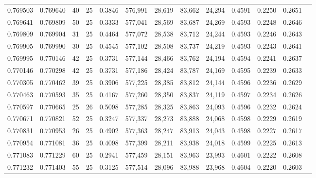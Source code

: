 \begin{tabular}{rrrrrrrrrrrrr}
0.769503 & 0.769640 &    40 &  25 &                                     0.3846 & 576,991 &  28,619 &  83,662 &  24,294 & 0.4591 & 0.2250 & 0.2651 \\
0.769641 & 0.769809 &    50 &  25 &                                     0.3333 & 577,041 &  28,569 &  83,687 &  24,269 & 0.4593 & 0.2248 & 0.2646 \\
0.769809 & 0.769904 &    31 &  25 &                                     0.4464 & 577,072 &  28,538 &  83,712 &  24,244 & 0.4593 & 0.2246 & 0.2643 \\
0.769905 & 0.769990 &    30 &  25 &                                     0.4545 & 577,102 &  28,508 &  83,737 &  24,219 & 0.4593 & 0.2243 & 0.2641 \\
0.769995 & 0.770146 &    42 &  25 &                                     0.3731 & 577,144 &  28,466 &  83,762 &  24,194 & 0.4594 & 0.2241 & 0.2637 \\
0.770146 & 0.770298 &    42 &  25 &                                     0.3731 & 577,186 &  28,424 &  83,787 &  24,169 & 0.4595 & 0.2239 & 0.2633 \\
0.770305 & 0.770462 &    39 &  25 &                                     0.3906 & 577,225 &  28,385 &  83,812 &  24,144 & 0.4596 & 0.2236 & 0.2629 \\
0.770463 & 0.770593 &    35 &  25 &                                     0.4167 & 577,260 &  28,350 &  83,837 &  24,119 & 0.4597 & 0.2234 & 0.2626 \\
0.770597 & 0.770665 &    25 &  26 &                                     0.5098 & 577,285 &  28,325 &  83,863 &  24,093 & 0.4596 & 0.2232 & 0.2624 \\
0.770671 & 0.770821 &    52 &  25 &                                     0.3247 & 577,337 &  28,273 &  83,888 &  24,068 & 0.4598 & 0.2229 & 0.2619 \\
0.770831 & 0.770953 &    26 &  25 &                                     0.4902 & 577,363 &  28,247 &  83,913 &  24,043 & 0.4598 & 0.2227 & 0.2617 \\
0.770954 & 0.771081 &    36 &  25 &                                     0.4098 & 577,399 &  28,211 &  83,938 &  24,018 & 0.4599 & 0.2225 & 0.2613 \\
0.771083 & 0.771229 &    60 &  25 &                                     0.2941 & 577,459 &  28,151 &  83,963 &  23,993 & 0.4601 & 0.2222 & 0.2608 \\
0.771232 & 0.771403 &    55 &  25 &                                     0.3125 & 577,514 &  28,096 &  83,988 &  23,968 & 0.4604 & 0.2220 & 0.2603 \\

\end{tabular}
